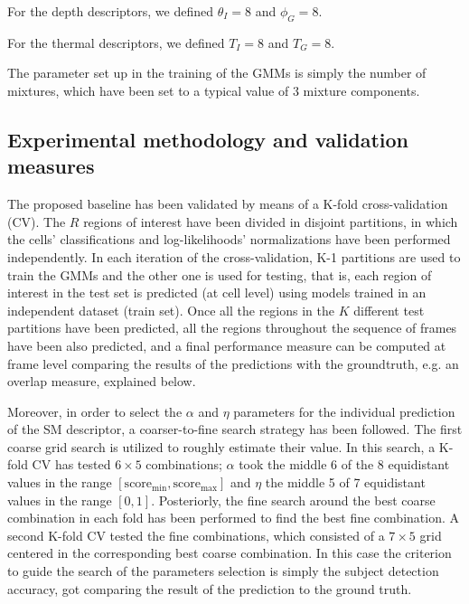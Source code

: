 \documentclass[10pt,twocolumn,letterpaper]{article}
\begin{document}
For the depth descriptors, we defined $\theta_{I} = 8$ and $\phi_{G} = 8$.

For the thermal descriptors, we defined $T_{I} = 8$ and $T_{G} = 8$.

The parameter set up in the training of the GMMs is simply the number of mixtures, which have been set to a typical value of 3 mixture components.

\subsection{Experimental methodology and validation measures}
\label{ssec:validation}

The proposed baseline has been validated by means of a K-fold cross-validation (CV). The $R$ regions of interest have been divided in disjoint partitions, in which the cells' classifications and log-likelihoods' normalizations have been performed independently. In each iteration of the cross-validation, K-1 partitions are used to train the GMMs and the other one is used for testing, that is, each region of interest in the test set is predicted (at cell level) using models trained in an independent dataset (train set). Once all the regions in the $K$ different test partitions have been predicted, all the regions throughout the sequence of frames have been also predicted, and a final performance measure can be computed at frame level comparing the results of the predictions with the groundtruth, e.g. an overlap measure, explained below.

Moreover, in order to select the $\alpha$ and $\eta$ parameters for the individual prediction of the SM descriptor, a coarser-to-fine search strategy has been followed. The first coarse grid search is utilized to roughly estimate their value. In this search, a K-fold CV has tested $6 
\times 5$ combinations; $\alpha$ took the middle 6 of the 8 equidistant values in the range $[\mathrm{score}_{\mathrm{min}}, \mathrm{score}_{\mathrm{max}}]$ and $\eta$ the middle 5 of 7 equidistant values in the range $[0,1]$. Posteriorly, the fine search around the best coarse combination in each fold has been performed to find the best fine combination. A second K-fold CV tested the fine combinations, which consisted of a $7 \times 5$ grid centered in the corresponding best coarse combination. In this case the criterion to guide the search of the parameters selection is simply the subject detection accuracy, got comparing the result of the prediction to the ground truth.
\end{document}
